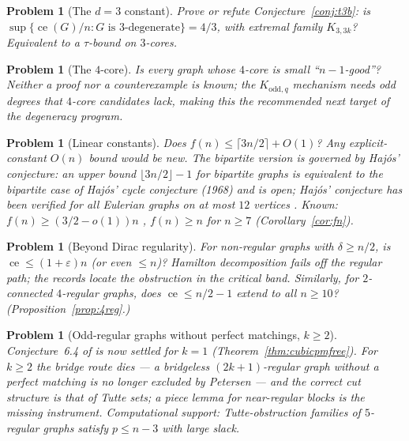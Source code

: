 \documentclass[a4paper,11pt]{amsart}
\newtheorem{problem}[theorem]{Problem}
\theoremstyle{definition}
\theoremstyle{remark}
\newcommand{\ce}{\operatorname{ce}}
\begin{document}
\begin{problem}[The $d=3$ constant]\label{prob:d3const}
Prove or refute Conjecture~\ref{conj:t3b}: is
$\sup\{\ce(G)/n : G \text{ is $3$-degenerate}\} = 4/3$, with extremal family $K_{3,3k}$? Equivalent to a
$\tau$-bound on $3$-cores.
\end{problem}

\begin{problem}[The $4$-core]\label{prob:fourcore}
Is every graph whose $4$-core is small ``$n-1$-good''? Neither a proof nor a counterexample is known; the
$K_{\mathrm{odd},q}$ mechanism needs odd degrees that $4$-core candidates lack, making this the recommended
next target of the degeneracy program.
\end{problem}

\begin{problem}[Linear constants]\label{prob:linear}
Does $f(n)\le\lceil3n/2\rceil+O(1)$? Any explicit-constant $O(n)$ bound would be new. The bipartite version
is governed by Haj\'os' conjecture: an upper bound $\lfloor3n/2\rfloor-1$ for bipartite graphs is
equivalent to the bipartite case of Haj\'os' cycle conjecture (1968) and is open; Haj\'os' conjecture has
been verified for all Eulerian graphs on at most $12$ vertices \cite{HNS17}. Known:
$f(n)\ge(3/2-o(1))n$ \cite{E83,BM22}, $f(n)\ge n$ for $n\ge7$ (Corollary~\ref{cor:fn}).
\end{problem}

\begin{problem}[Beyond Dirac regularity]\label{prob:beyond}
For non-regular graphs with $\delta\ge n/2$, is $\ce\le(1+\varepsilon)n$ (or even $\le n$)? Hamilton
decomposition fails off the regular path; the records locate the obstruction in the critical band.
Similarly, for $2$-connected $4$-regular graphs, does $\ce\le n/2-1$ extend to all $n\ge10$?
(Proposition~\ref{prop:4reg}.)
\end{problem}

\begin{problem}[Odd-regular graphs without perfect matchings, $k\ge2$]\label{prob:oddk}
Conjecture~6.4 of \cite{AABC25} is now settled for $k=1$ (Theorem~\ref{thm:cubicpmfree}). For $k\ge2$ the
bridge route dies --- a bridgeless $(2k+1)$-regular graph without a perfect matching is no longer excluded
by Petersen --- and the correct cut structure is that of Tutte sets; a piece lemma for near-regular blocks
is the missing instrument. Computational support: Tutte-obstruction families of $5$-regular graphs satisfy
$p\le n-3$ with large slack.
\end{problem}
\end{document}
